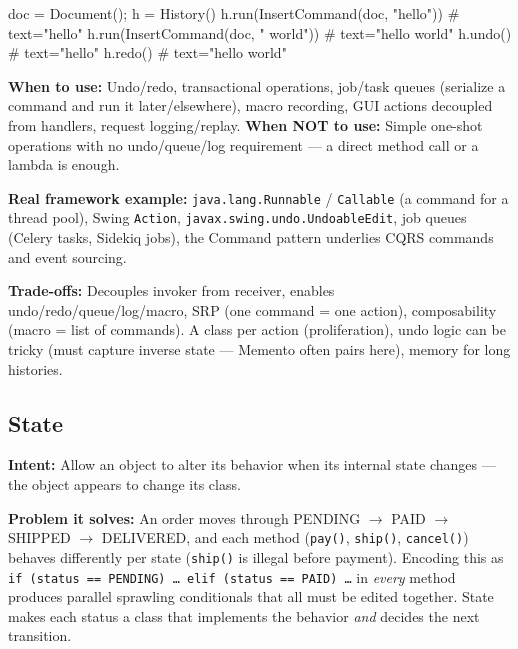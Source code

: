 \documentclass[11pt]{article}
\newenvironment{Shaded}{\begin{snugshade}}{\end{snugshade}}
\newcommand{\CommentTok}[1]{\textcolor[rgb]{0.48,0.49,0.49}{#1}}
\newcommand{\NormalTok}[1]{\textcolor[rgb]{0.81,0.81,0.76}{#1}}
\newcommand{\OperatorTok}[1]{\textcolor[rgb]{0.81,0.81,0.76}{#1}}
\newcommand{\StringTok}[1]{\textcolor[rgb]{0.96,0.31,0.31}{#1}}
\begin{document}
\begin{Shaded}
\begin{Highlighting}[]
\NormalTok{doc }\OperatorTok{=}\NormalTok{ Document()}\OperatorTok{;}\NormalTok{ h }\OperatorTok{=}\NormalTok{ History()}
\NormalTok{h.run(InsertCommand(doc, }\StringTok{"hello"}\NormalTok{))   }\CommentTok{\# text="hello"}
\NormalTok{h.run(InsertCommand(doc, }\StringTok{" world"}\NormalTok{))  }\CommentTok{\# text="hello world"}
\NormalTok{h.undo()                             }\CommentTok{\# text="hello"}
\NormalTok{h.redo()                             }\CommentTok{\# text="hello world"}
\end{Highlighting}
\end{Shaded}

\textbf{When to use:} Undo/redo, transactional operations, job/task queues (serialize a command and run it later/elsewhere), macro recording, GUI actions decoupled from handlers, request logging/replay. \textbf{When NOT to use:} Simple one-shot operations with no undo/queue/log requirement --- a direct method call or a lambda is enough.

\textbf{Real framework example:} \texttt{java.lang.Runnable} / \texttt{Callable} (a command for a thread pool), Swing \texttt{Action}, \texttt{javax.swing.undo.UndoableEdit}, job queues (Celery tasks, Sidekiq jobs), the Command pattern underlies CQRS commands and event sourcing.

\textbf{Trade-offs:} Decouples invoker from receiver, enables undo/redo/queue/log/macro, SRP (one command = one action), composability (macro = list of commands). A class per action (proliferation), undo logic can be tricky (must capture inverse state --- Memento often pairs here), memory for long histories.

\subsection{State}\label{state}

\textbf{Intent:} Allow an object to alter its behavior when its internal state changes --- the object appears to change its class.

\textbf{Problem it solves:} An order moves through PENDING \(\rightarrow\) PAID \(\rightarrow\) SHIPPED \(\rightarrow\) DELIVERED, and each method (\texttt{pay()}, \texttt{ship()}, \texttt{cancel()}) behaves differently per state (\texttt{ship()} is illegal before payment). Encoding this as \texttt{if\ (status\ ==\ PENDING)\ …\ elif\ (status\ ==\ PAID)\ …} in \emph{every} method produces parallel sprawling conditionals that all must be edited together. State makes each status a class that implements the behavior \emph{and} decides the next transition.
\end{document}
